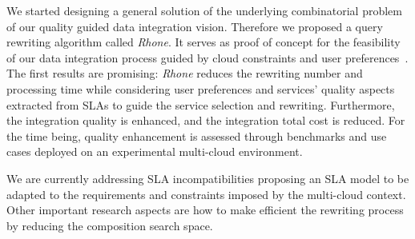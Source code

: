 We started designing a general solution of the underlying combinatorial problem of our quality guided data integration vision. Therefore we proposed  a query rewriting algorithm called \textit{Rhone}. It serves as proof of concept for the feasibility of our data integration process guided by cloud constraints and user preferences~\cite{carvalho2016}. The first results are promising: \textit{Rhone} reduces the rewriting number and processing time while considering user preferences and services' quality aspects extracted from SLAs to guide the service selection and rewriting. Furthermore, the integration quality is enhanced, and the integration total cost is reduced. For the time being, quality enhancement is  assessed through benchmarks and use cases deployed on an experimental multi-cloud environment. 

We are currently addressing SLA incompatibilities proposing an SLA model   to be adapted to the requirements and constraints imposed by the multi-cloud context.  Other important research aspects are how to make efficient the rewriting process by reducing the composition search space. 
